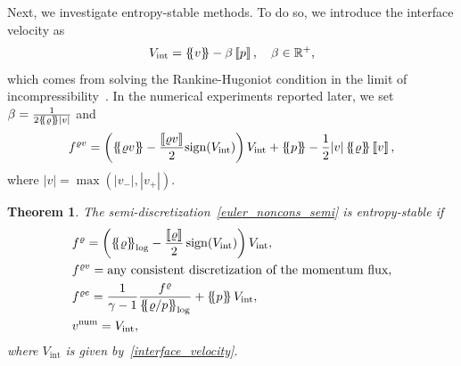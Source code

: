 \documentclass[]{scrartcl}
\newcommand*{\ldblbrace}{\{\mskip-5mu \left \{}
\newcommand*{\rdblbrace}{ \}\mskip-5mu \right \}}
\newcommand{\mean}[1]{\left\ldblbrace #1 \right\rdblbrace}
\newcommand{\jump}[1]{\left\llbracket #1  \right\rrbracket}
\newtheorem{theorem}{Theorem}[section]
\theoremstyle{definition}
\begin{document}
Next, we investigate entropy-stable methods.
To do so, we introduce the interface velocity as
\begin{equation}
V_\mathrm{int} = \mean{v} -\beta \jump{p}, \quad \beta \in \mathbb{R}^+,
\label{interface_velocity}
\end{equation}
which comes from solving the Rankine-Hugoniot condition in the limit of incompressibility~\cite{AControlVolumeModeloftheCompressibleEulerEquationswithaVerticalLagrangianCoordinate}.
In the numerical experiments reported later, we set $\beta = \frac{1}{2 \mean{\varrho}|v|}$ and
\begin{equation}
f^{\varrho v} = \left (\mean{\varrho v} - \frac{\jump{\varrho v}}{2}\text{sign}(V_\mathrm{int}) \right ) V_\mathrm{int} + \mean{p} - \frac{1}{2}|v| \mean{\varrho} \jump{v},
\end{equation}
where $|v| = \max(|v_-|, |v_+|)$.
\begin{theorem}
The semi-discretization~\eqref{euler_noncons_semi} is entropy-stable if
\begin{equation}
    \label{eq:es_flux}
    \begin{aligned}
    & f^{\varrho}= \left (\mean{\varrho}_{\log} - \frac{\jump{\varrho}}{2} \operatorname{sign}(V_{\mathrm{int}}) \right ) V_{\mathrm{int}},\\
    & f^{\varrho v} = \text{any consistent discretization of the momentum flux},\\
    & f^{\varrho e} = \frac{1}{\gamma-1}\frac{f^{\varrho}}{ \mean{\varrho/p}_{\log}}  + \mean{p} V_{\mathrm{int}},\\
    & v^{\mathrm{num}} = V_{\mathrm{int}},\\
    \end{aligned}
\end{equation}
where $V_{\mathrm{int}}$ is given by~\eqref{interface_velocity}.
\end{theorem}
\end{document}
